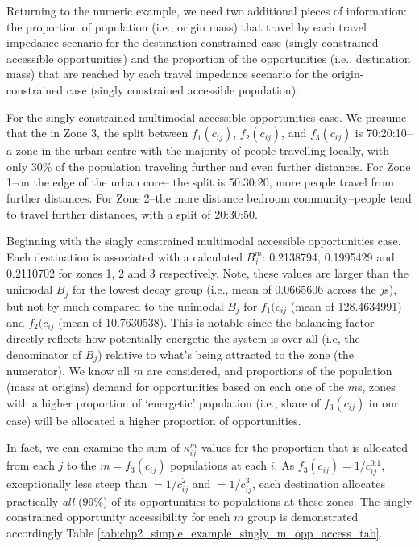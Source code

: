 \documentclass[
11pt, %
oneside, %
english, %
singlespacing, %
]{macthesis} %
\begin{document}
Returning to the numeric example, we need two additional pieces of information: the proportion of population (i.e., origin mass) that travel by each travel impedance scenario for the destination-constrained case (singly constrained accessible opportunities) and the proportion of the opportunities (i.e., destination mass) that are reached by each travel impedance scenario for the origin-constrained case (singly constrained accessible population).

For the singly constrained multimodal accessible opportunities case. We presume that the in Zone 3, the split between \(f_1(c_{ij})\), \(f_2(c_{ij})\), and \(f_3(c_{ij})\) is 70:20:10--a zone in the urban centre with the majority of people travelling locally, with only 30\% of the population traveling further and even further distances. For Zone 1--on the edge of the urban core-- the split is 50:30:20, more people travel from further distances. For Zone 2--the more distance bedroom community--people tend to travel further distances, with a split of 20:30:50.

Beginning with the singly constrained multimodal accessible opportunities case. Each destination is associated with a calculated \(B_j^m\): 0.2138794, 0.1995429 and 0.2110702 for zones 1, 2 and 3 respectively. Note, these values are larger than the unimodal \(B_j\) for the lowest decay group (i.e., mean of 0.0665606 across the \(j\)s), but not by much compared to the unimodal \(B_j\) for \(f_1(c_{ij}\) (mean of 128.4634991) and \(f_2(c_{ij}\) (mean of 10.7630538). This is notable since the balancing factor directly reflects how potentially energetic the system is over all (i.e, the denominator of \(B_j\)) relative to what's being attracted to the zone (the numerator). We know all \(m\) are considered, and proportions of the population (mass at origins) demand for opportunities based on each one of the \(m\)s, zones with a higher proportion of `energetic' population (i.e., share of \(f_3(c_{ij})\) in our case) will be allocated a higher proportion of opportunities.

In fact, we can examine the sum of \(\kappa_{ij}^m\) values for the proportion that is allocated from each \(j\) to the \(m = f_3(c_{ij})\) populations at each \(i\). As \(f_3(c_{ij}) = 1/c_{ij}^0.1\), exceptionally less steep than \(= 1/c_{ij}^2\) and \(= 1/c_{ij}^3\), each destination allocates practically \emph{all} (99\%) of its opportunities to populations at these zones. The singly constrained opportunity accessibility for each \(m\) group is demonstrated accordingly Table \ref{tab:chp2_simple_example_singly_m_opp_access_tab}.
\end{document}
